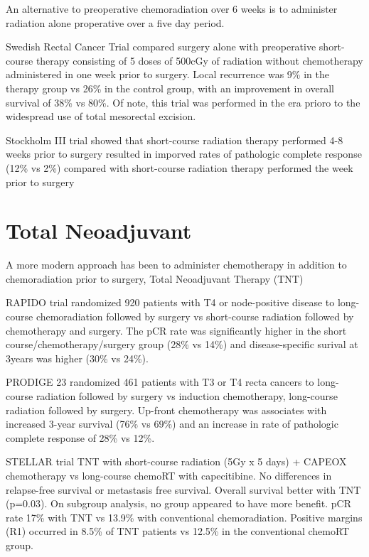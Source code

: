 \documentclass[
]{book}
\begin{document}
An alternative to preoperative chemoradiation over 6 weeks is to administer radiation alone properative over a five day period.

Swedish Rectal Cancer Trial compared surgery alone with preoperative short-course therapy consisting of 5 doses of 500cGy of radiation without chemotherapy administered in one week prior to surgery. Local recurrence was 9\% in the therapy group vs 26\% in the control group, with an improvement in overall survival of 38\% vs 80\%\citep{swedishrectalcancertrial980}. Of note, this trial was performed in the era prioro to the widespread use of total mesorectal excision.

Stockholm III trial showed that short-course radiation therapy performed 4-8 weeks prior to surgery resulted in imporved rates of pathologic complete response (12\% vs 2\%) compared with short-course radiation therapy performed the week prior to surgery \citep{pettersson972}

\hypertarget{total-neoadjuvant}{%
\section{Total Neoadjuvant}\label{total-neoadjuvant}}

A more modern approach has been to administer chemotherapy in addition to chemoradiation prior to surgery, Total Neoadjuvant Therapy (TNT)

RAPIDO trial randomized 920 patients with T4 or node-positive disease to long-course chemoradiation followed by surgery vs short-course radiation followed by chemotherapy and surgery. The pCR rate was significantly higher in the short course/chemotherapy/surgery group (28\% vs 14\%) and disease-specific surival at 3years was higher (30\% vs 24\%).\citep{bahadoer29} \citep{vandervalk75}

PRODIGE 23 randomized 461 patients with T3 or T4 recta cancers to long-course radiation followed by surgery vs induction chemotherapy, long-course radiation followed by surgery. Up-front chemotherapy was associates with increased 3-year survival (76\% vs 69\%) and an increase in rate of pathologic complete response of 28\% vs 12\%.\citep{conroy702}

STELLAR trial \citep{jin1681} TNT with short-course radiation (5Gy x 5 days) + CAPEOX chemotherapy vs long-course chemoRT with capecitibine. No differences in relapse-free survival or metastasis free survival. Overall survival better with TNT (p=0.03). On subgroup analysis, no group appeared to have more benefit. pCR rate 17\% with TNT vs 13.9\% with conventional chemoradiation. Positive margins (R1) occurred in 8.5\% of TNT patients vs 12.5\% in the conventional chemoRT group.
\end{document}
